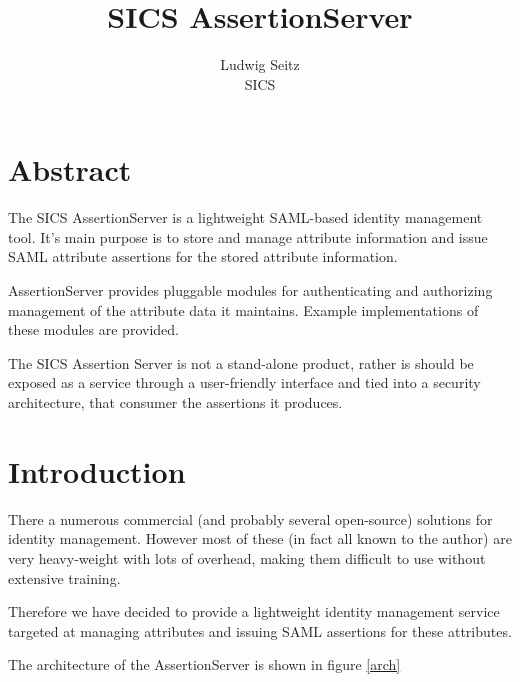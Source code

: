 \documentclass[10pt,a4paper]{article}
\title{SICS AssertionServer}
\author{Ludwig Seitz \\SICS}
\begin{document}
\maketitle


\section*{\center \small Abstract}

{\small 
The SICS AssertionServer is a lightweight SAML-based identity management tool.
It's main purpose is to store and manage attribute information and issue
SAML attribute assertions for the stored attribute information.

AssertionServer provides pluggable modules for authenticating and authorizing
management of the attribute data it maintains. Example implementations of
these modules are provided.

The SICS Assertion Server is not a stand-alone product, rather is should be 
exposed as a service through a user-friendly interface and tied into a security
architecture, that consumer the assertions it produces.
}

\section{Introduction}
There a numerous commercial (and probably several open-source) solutions for 
identity management. However most of these (in fact all known to the author)
are very heavy-weight with lots of overhead, making them difficult to use
without extensive training.

Therefore we have decided to provide a lightweight identity management
service targeted at managing attributes and issuing SAML \cite{SAML2}
assertions for these attributes.

The architecture of the AssertionServer is shown in figure \ref{arch}
\end{document}

